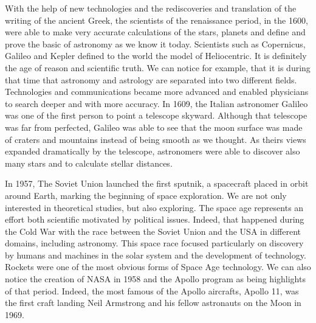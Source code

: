 With the help of new technologies and the rediscoveries and translation of the writing of the ancient Greek, the scientists of the renaissance period, in the 1600, were able to make very accurate calculations of the stars, planets and define and prove the basic of astronomy as we know it today.  
Scientists such as Copernicus, Galileo and Kepler defined to the world the model of Heliocentric. 
It is definitely the age of reason and scientific truth. 
We can notice for example, that it is during that time that astronomy and astrology are separated into two different fields. 
Technologies and communications became more advanced and enabled physicians to search deeper and with more accuracy. 
In 1609, the Italian astronomer Galileo was one of the first person to point a telescope skyward. 
Although that telescope was far from perfected, Galileo was able to see that the moon surface was made of craters and mountains instead of being smooth as we thought. 
As theirs views expanded dramatically by the telescope, astronomers were able to discover also many stars and to calculate stellar distances.

In 1957, The Soviet Union launched the first sputnik, a spacecraft placed in orbit around Earth, marking the beginning of space exploration. 
We are not only interested in theoretical studies, but also exploring. 
The space age represents an effort both scientific motivated by political issues. 
Indeed, that happened during the Cold War with the race between the Soviet Union and the USA in different domains, including astronomy. 
This space race focused particularly on discovery by humans and machines in the solar system and the development of technology. 
Rockets were one of the most obvious forms of Space Age technology. 
We can also notice the creation of NASA in 1958 and the Apollo program as being highlights of that period. 
Indeed, the most famous of the Apollo aircrafts, Apollo 11, was the first craft landing Neil Armstrong and his fellow astronauts on the Moon in 1969.



















